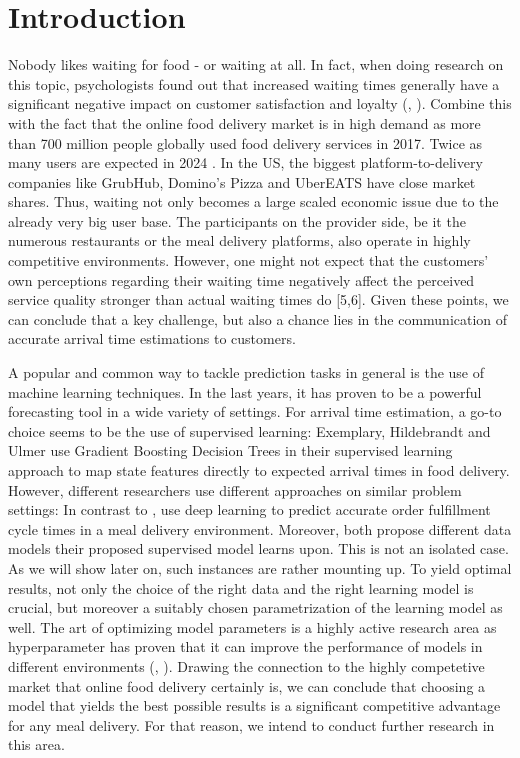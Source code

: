 \chapter{Introduction}
Nobody likes waiting for food - or waiting at all. In fact, when doing research on this topic, psychologists found out that increased waiting times generally have a significant negative impact on customer satisfaction and loyalty (\citealt{WaitingTime1}, \citealt{WaitingTime2}). Combine this with the fact that the online food delivery market is in high demand as more than 700 million people globally used food delivery services in 2017. Twice as many users are expected in 2024 \citep{Statista1}. In the US, the biggest platform-to-delivery companies like GrubHub, Domino's Pizza and UberEATS have close market shares. Thus, waiting not only becomes a large scaled economic issue due to the already very big user base. The participants on the provider side, be it the numerous restaurants or the meal delivery platforms, also operate in highly competitive environments. However, one might not expect that the customers’ own perceptions regarding their waiting time negatively affect the perceived service quality stronger than actual waiting times do [5,6]. Given these points, we can conclude that a key challenge, but also a chance lies in the communication of accurate arrival time estimations to customers. 

A popular and common way to tackle prediction tasks in general is the use of machine learning techniques. In the last years, it has proven to be a powerful forecasting tool in a wide variety of settings. For arrival time estimation, a go-to choice seems to be the use of supervised learning: Exemplary, Hildebrandt and Ulmer use Gradient Boosting Decision Trees in their supervised learning approach to map state features directly to expected arrival times in food delivery. However, different researchers use different approaches on similar problem settings: In contrast to \cite{Hildebrandt2020_EAT}, \cite{Zhu2020_OFCTE_DL} use deep learning to predict accurate order fulfillment cycle times in a meal delivery environment. Moreover, both propose different data models their proposed supervised model learns upon. This is not an isolated case. As we will show later on, such instances are rather mounting up. 
To yield optimal results, not only the choice of the right data and the right learning model is crucial, but moreover a suitably chosen parametrization of the learning model as well. The art of optimizing model parameters is a highly active research area as hyperparameter has proven that it can improve the performance of models in different environments (\citealt{HPOMotivation}, \citealt{WU201926}).
Drawing the connection to the highly competetive market that online food delivery certainly is, we can conclude that choosing a model that yields the best possible results is a significant competitive advantage for any meal delivery. For that reason, we intend to conduct further research in this area.

